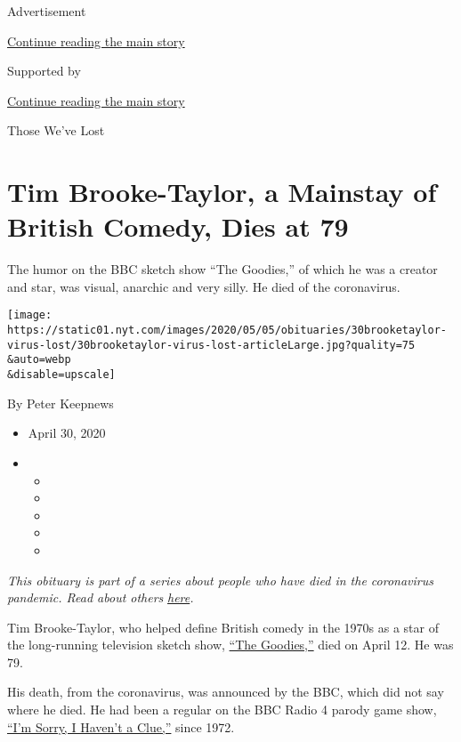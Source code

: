 Advertisement

\protect\hyperlink{after-top}{Continue reading the main story}

Supported by

\protect\hyperlink{after-sponsor}{Continue reading the main story}

Those We've Lost

\hypertarget{tim-brooke-taylor-a-mainstay-of-british-comedy-dies-at-79}{%
\section{Tim Brooke-Taylor, a Mainstay of British Comedy, Dies at
79}\label{tim-brooke-taylor-a-mainstay-of-british-comedy-dies-at-79}}

The humor on the BBC sketch show ``The Goodies,'' of which he was a
creator and star, was visual, anarchic and very silly. He died of the
coronavirus.

\texttt{[image: https://static01.nyt.com/images/2020/05/05/obituaries/30brooketaylor-virus-lost/30brooketaylor-virus-lost-articleLarge.jpg?quality=75\\\&auto=webp\\\&disable=upscale]}

By Peter Keepnews

\begin{itemize}
\item
  April 30, 2020
\item
  \begin{itemize}
  \item
  \item
  \item
  \item
  \item
  \end{itemize}
\end{itemize}

\emph{This obituary is part of a series about people who have died in
the coronavirus pandemic. Read about others}
\href{https://www.nytimes.com/series/people-who-have-died-of-the-coronavirus}{\emph{here}}\emph{.}

Tim Brooke-Taylor, who helped define British comedy in the 1970s as a
star of the long-running television sketch show,
\href{https://www.youtube.com/watch?v=y7lbqiE3LWQ}{``The Goodies,''}
died on April 12. He was 79.

His death, from the coronavirus, was announced by the BBC, which did not
say where he died. He had been a regular on the BBC Radio 4 parody game
show, \href{https://www.youtube.com/watch?v=aRFzVdvNQXo}{``I'm Sorry, I
Haven't a Clue,''} since 1972.

